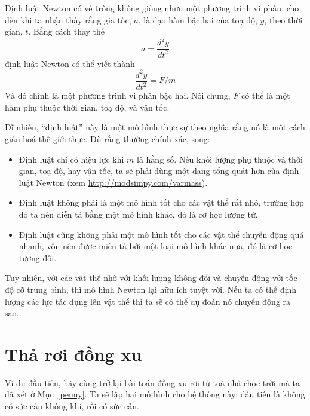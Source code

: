 \documentclass[12pt, openany]{book}
\theoremstyle{exercise}
\begin{document}

Định luật Newton có vẻ trông không giống nhưu một phương trình vi phân, cho đến khi ta nhận thấy rằng gia tốc, $a$, là đạo hàm bậc hai của toạ độ, $y$, theo thời gian, $t$.  Bằng cách thay thế
%
\[ a = \frac{d^2y}{dt^2} \]
%
định luật Newton có thể viết thành
%
\[ \frac{d^2y}{dt^2} = F / m \]
%
Và đó chính là một phương trình vi phân bậc hai. Nói chung, $F$ có thể là một hàm phụ thuộc thời gian, toạ độ, và vận tốc.

Dĩ nhiên, ``định luật'' này là một mô hình thực sự theo nghĩa rằng nó là một cách giản hoá thế giới thực. Dù rằng thường chính xác, song:

\begin{itemize}

\item Định luật chỉ có hiệu lực khi $m$ là hằng số. Nếu khối lượng phụ thuộc và thời gian, toạ độ, hay vận tốc, ta sẽ phải dùng một dạng tổng quát hơn của định luật Newton (xem \url{http://modsimpy.com/varmass}).


\item Định luật không phải là một mô hình tốt cho các vật thể rất nhỏ, trường hợp đó ta nên diễn tả bằng một mô hình khác, đó là cơ học lượng tử.


\item Định luật cũng không phải một mô hình tốt cho các vật thể chuyển động quá nhanh, vốn nên được miêu tả bởi một loại mô hình khác nữa, đó là cơ học tương đối.


\end{itemize}

Tuy nhiên, với các vật thể nhỡ với khối lượng không đổi và chuyển động với tốc độ cỡ trung bình, thì mô hình Newton lại hữu ích tuyệt vời. Nếu ta có thể định lượng các lực tác dụng lên vật thể thì ta sẽ có thể dự đoán nó chuyển động ra sao.


\section{Thả rơi đồng xu}

Ví dụ đầu tiên, hãy cùng trở lại bài toán đồng xu rơi từ toà nhà chọc trời mà ta đã xét ở Mục~\ref{penny}.  Ta sẽ lập hai mô hình cho hệ thống này: đầu tiên là không có sức cản không khí, rồi có sức cản.
\end{document}
